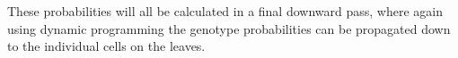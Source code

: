 \documentclass[../../main.tex]{subfiles}
\begin{document}
These probabilities will all be calculated in a final downward pass, where again using dynamic programming the genotype probabilities can be propagated down to the individual cells on the leaves.
\end{document}
